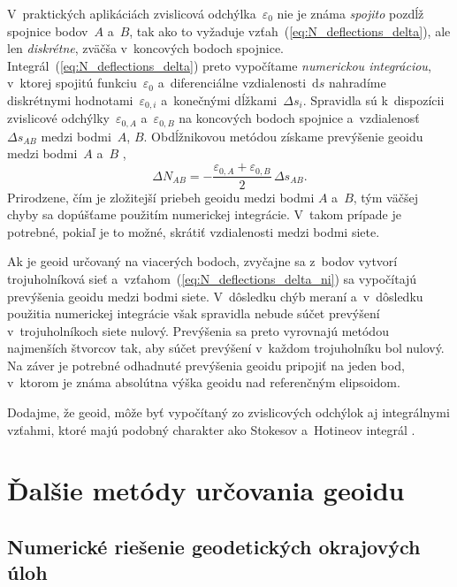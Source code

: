 \documentclass[a4paper,12pt]{book}
\newcommand{\diff}{\mathrm d}
\begin{document}
V~praktických aplikáciách zvislicová odchýlka~$\varepsilon_0$ nie je známa 
\emph{spojito} pozdĺž spojnice bodov~$A$ a~$B$, tak ako to vyžaduje 
vzťah~(\ref{eq:N_deflections_delta}), ale len \emph{diskrétne}, zväčša 
v~koncových bodoch spojnice.  Integrál~(\ref{eq:N_deflections_delta}) preto 
vypočítame \emph{numerickou integráciou}, v~ktorej spojitú 
funkciu~$\varepsilon_0$ a~diferenciálne vzdialenosti~$\diff s$ nahradíme 
diskrétnymi hodnotami~$\varepsilon_{0,i}$ a~konečnými dĺžkami~$\Delta s_i$.  
Spravidla sú k~dispozícii zvislicové odchýlky~$\varepsilon_{0,A}$ 
a~$\varepsilon_{0,B}$ na koncových bodoch spojnice a~vzdialenosť~$\Delta 
s_{AB}$ medzi bodmi~$A$, $B$.  Obdĺžnikovou metódou získame prevýšenie geoidu 
medzi bodmi~$A$ a~$B$ \parencite[pre popis obdĺžnikovej metódy pozri 
napríklad][]{Macak2021},
%
\begin{equation}
\label{eq:N_deflections_delta_ni}
\Delta N_{AB} = -\frac{\varepsilon_{0,A} + \varepsilon_{0,B}}{2} \, \Delta 
s_{AB}{.}
\end{equation}
%
Prirodzene, čím je zložitejší priebeh geoidu medzi bodmi $A$ a~$B$, tým väčšej 
chyby sa dopúšťame použitím numerickej integrácie.  V~takom prípade je 
potrebné, pokiaľ je to možné, skrátiť vzdialenosti medzi bodmi siete.

Ak je geoid určovaný na viacerých bodoch, zvyčajne sa z~bodov vytvorí 
trojuholníková sieť a~vzťahom~(\ref{eq:N_deflections_delta_ni}) sa vypočítajú 
prevýšenia geoidu medzi bodmi siete.  V~dôsledku chýb meraní a~v~dôsledku 
použitia numerickej integrácie však spravidla nebude súčet prevýšení 
v~trojuholníkoch siete nulový.  Prevýšenia sa preto vyrovnajú metódou 
najmenších štvorcov tak, aby súčet prevýšení v~každom trojuholníku bol nulový.  
Na záver je potrebné odhadnuté prevýšenia geoidu pripojiť na jeden bod, 
v~ktorom je známa absolútna výška geoidu nad referenčným elipsoidom.

Dodajme, že geoid, môže byť vypočítaný zo zvislicových odchýlok aj integrálnymi 
vzťahmi, ktoré majú podobný charakter ako Stokesov a~Hotineov integrál 
\parencite[pozri napríklad][]{Sjoberg2017}.


\section{Ďalšie metódy určovania geoidu}
\label{sec:other_geoid_determination_methods}

\subsection{Numerické riešenie geodetických okrajových úloh}
\end{document}
